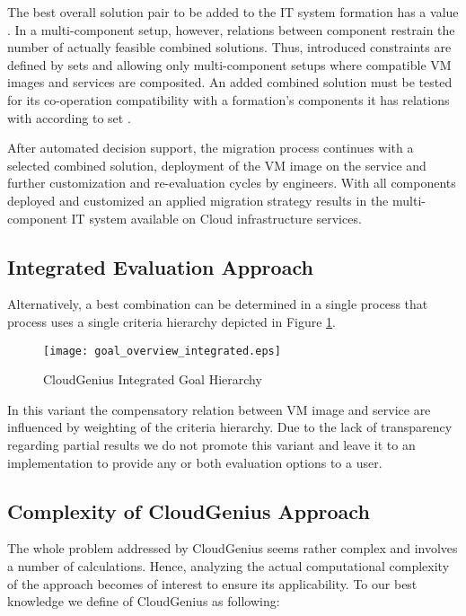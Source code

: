 \documentclass[10pt]{article}
\begin{document}
The best overall solution pair to be added to the IT system formation has a value . In a multi-component setup, however, relations between component restrain the number of actually feasible combined solutions. Thus, introduced constraints are defined by sets  and  allowing only multi-component setups where compatible VM images and services are composited. An added combined solution must be tested for its co-operation compatibility with a formation's components it has relations with according to set .

After automated decision support, the migration process continues with a selected combined solution, deployment of the VM image on the service and further customization and re-evaluation cycles by engineers. With all components deployed and customized an applied migration strategy results in the multi-component IT system available on Cloud infrastructure services.

\subsection{Integrated Evaluation Approach}

Alternatively, a best combination can be determined in a single  process that process uses a single criteria hierarchy depicted in Figure \ref{overview-goals-integrated}. 

\begin{figure}[h]
\centering
\texttt{[image: goal\_overview\_integrated.eps]} 
\caption{CloudGenius Integrated Goal Hierarchy}\label{overview-goals-integrated}
\end{figure}

In this variant the compensatory relation between VM image and service are influenced by weighting of the criteria hierarchy. Due to the lack of transparency regarding partial results we do not promote this variant and leave it to an implementation to provide any or both evaluation options to a user.

\subsection{Complexity of CloudGenius Approach}

The whole problem addressed by CloudGenius seems rather complex and involves a number of calculations. Hence, analyzing the actual computational complexity of the approach becomes of interest to ensure its applicability. To our best knowledge we define  of CloudGenius as following:
\end{document}
